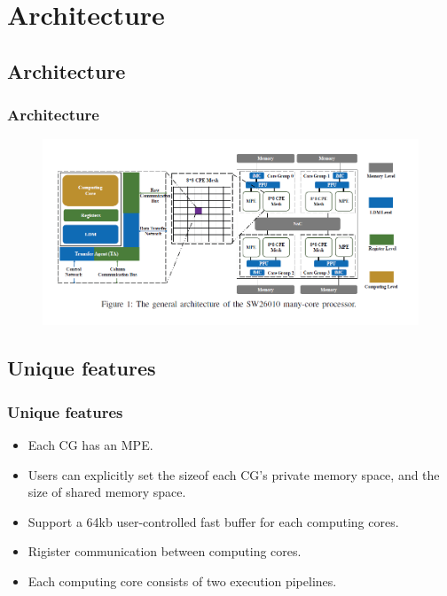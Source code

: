 \section{Architecture}

\subsection{Architecture}
\begin{frame}
    \frametitle{Architecture}
	\begin{figure}
		\includegraphics[scale=0.4]{figure/archi.PNG}
	\end{figure} 
\end{frame}

\subsection{Unique features}
\begin{frame}
    \frametitle{Unique features}
	\begin{itemize}
		\item Each CG has an MPE.
		\item Users can explicitly set the sizeof each CG's private memory space, and the size of shared memory space.  
		\item Support a 64kb user-controlled fast buffer for each computing cores. 
		\item Rigister communication between computing cores.
		\item Each computing core consists of two execution pipelines.  
	\end{itemize} 
\end{frame}

